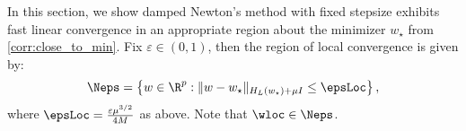 

    
In this section, we show damped Newton's method with fixed stepsize exhibits fast linear convergence in an appropriate region about the minimizer $w_\star$ from \cref{corr:close_to_min}. 
Fix $\varepsilon \in (0,1)$, then the region of local convergence is given by:
\[
\Neps = \left\{w\in \R^p: \|w-w_\star\|_{H_L(w_\star)+\mu I}\leq \epsLoc\right\},
\]
where $\epsLoc = \frac{\varepsilon \mu^{3/2}}{4M}$ as above. 
Note that $\wloc \in \Neps$.

